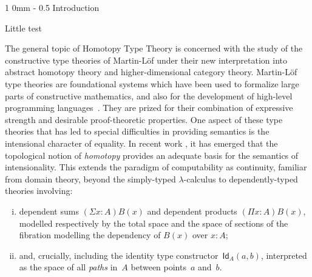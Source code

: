 \documentclass[reqno,10pt,a4paper,oneside]{amsart}
\makeatletter
\newcommand{\Id}{\mathsf{Id}}
\newcommand{\id}[1]{\Id_{#1}}
\renewcommand{\section}{\@startsection
  {section}%
   {1}%
  {0mm}%
   {-\baselineskip}%
  {0.5\baselineskip}%
   {\Large\bfseries}}%
\numberwithin{equation}{section}
\theoremstyle{mythm}
\theoremstyle{mydef}
\theoremstyle{myrmk}
\makeatother
\begin{document}
\maketitle


\begin{small}
\tableofcontents
\end{small}


\section{Introduction}

Little test

The general topic of Homotopy Type Theory is concerned with the study of the constructive type theories of Martin-L\"of under their new interpretation into abstract homotopy theory and higher-dimensional category theory. Martin-L\"of type theories are foundational systems which have been used to formalize large parts of constructive mathematics, and also for the development of high-level programming languages~\cite{MartinLofP:conmcp}.  They are prized for their combination of expressive strength and desirable proof-theoretic properties.  One aspect of these type theories that has led to special difficulties in providing semantics is the intensional character of equality.  In recent work \cite{AwodeyS:homtmi,VoevodskyV:notts,vandenBergB:topsmi,AwodeyS:typth}, it has emerged that the topological notion of \emph{homotopy} provides an adequate basis for the semantics of intensionality.  This extends the paradigm of computability as continuity, familiar from domain theory, beyond the simply-typed 
$\lambda$-calculus to dependently-typed theories involving:\begin{enumerate}[(i)]
\item dependent sums $(\Sigma x\colon\!{A})B(x)$ and dependent products $(\Pi x\colon\!{A})B(x)$, modelled respectively by the total space and the space of sections of the fibration modelling the dependency of $B(x)$ over $ x : A$; \item
and, crucially, including the identity type constructor~$\id{A}(a,b)$, interpreted as the space of all \emph{paths} in~$A$ between points~$a$ and~$b$. \end{enumerate}
\end{document}
